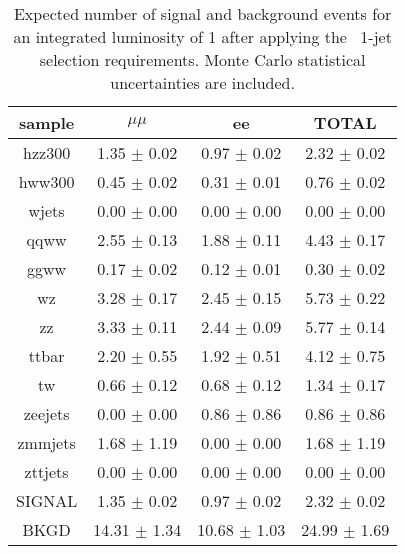 \begin{table}[!ht]
\begin{center}
\begin{tabular}{c|c|c|c}
\hline
sample    & $\mu\mu$    & ee     & TOTAL\\ \hline 
hzz300   & 1.35 $\pm$ 0.02   & 0.97 $\pm$ 0.02   & 2.32 $\pm$ 0.02 \\ \hline 
hww300   & 0.45 $\pm$ 0.02   & 0.31 $\pm$ 0.01   & 0.76 $\pm$ 0.02 \\ \hline 
wjets   & 0.00 $\pm$ 0.00   & 0.00 $\pm$ 0.00   & 0.00 $\pm$ 0.00 \\ \hline 
qqww   & 2.55 $\pm$ 0.13   & 1.88 $\pm$ 0.11   & 4.43 $\pm$ 0.17 \\ \hline 
ggww   & 0.17 $\pm$ 0.02   & 0.12 $\pm$ 0.01   & 0.30 $\pm$ 0.02 \\ \hline 
wz   & 3.28 $\pm$ 0.17   & 2.45 $\pm$ 0.15   & 5.73 $\pm$ 0.22 \\ \hline 
zz   & 3.33 $\pm$ 0.11   & 2.44 $\pm$ 0.09   & 5.77 $\pm$ 0.14 \\ \hline 
ttbar   & 2.20 $\pm$ 0.55   & 1.92 $\pm$ 0.51   & 4.12 $\pm$ 0.75 \\ \hline 
tw   & 0.66 $\pm$ 0.12   & 0.68 $\pm$ 0.12   & 1.34 $\pm$ 0.17 \\ \hline 
zeejets   & 0.00 $\pm$ 0.00   & 0.86 $\pm$ 0.86   & 0.86 $\pm$ 0.86 \\ \hline 
zmmjets   & 1.68 $\pm$ 1.19   & 0.00 $\pm$ 0.00   & 1.68 $\pm$ 1.19 \\ \hline 
zttjets   & 0.00 $\pm$ 0.00   & 0.00 $\pm$ 0.00   & 0.00 $\pm$ 0.00 \\ \hline 
SIGNAL   & 1.35 $\pm$ 0.02   & 0.97 $\pm$ 0.02   & 2.32 $\pm$ 0.02 \\ \hline 
BKGD   & 14.31 $\pm$ 1.34   & 10.68 $\pm$ 1.03   & 24.99 $\pm$ 1.69 \\ \hline 
\end{tabular}
\caption{Expected number of signal and background events for an 
  integrated luminosity of 1\ifb{} after applying the \zz\ 
  1-jet selection requirements. Monte Carlo statistical 
  uncertainties are included.}
\label{tab:mcyield_zzsel_1j}
\end{center}
\end{table}

